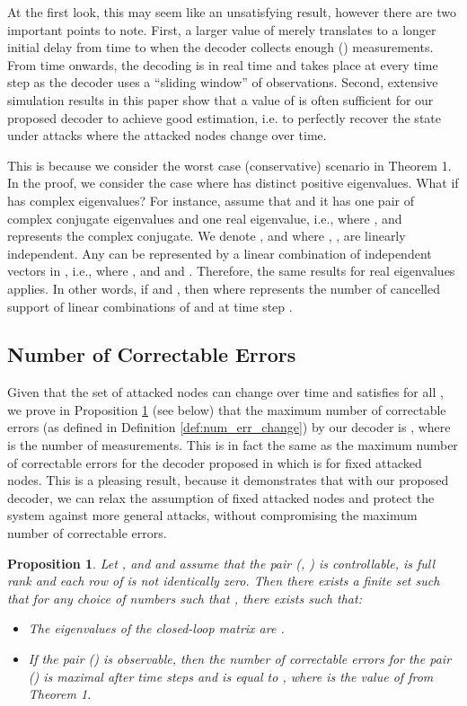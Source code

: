 \documentclass[journal]{IEEEtran}
\newtheorem{prop}{\bf{Proposition}}
\begin{document}
At the first look, this may seem like an unsatisfying result, however there are two important points to note. First, a larger value of  merely translates to a longer initial delay from time  to  when the decoder collects enough () measurements. From time  onwards, the decoding is in real time and takes place at every time step  as the decoder uses a ``sliding window'' of observations. Second, extensive simulation results in this paper show that a value of  is often sufficient for our proposed decoder to achieve good estimation, i.e. to perfectly recover the state under attacks where the attacked nodes change over time. 

This is because we consider the worst case (conservative) scenario in Theorem 1. 
In the proof, we consider the case where  has  distinct positive eigenvalues. What if  has complex eigenvalues? For instance, assume that   and it has one pair of complex conjugate eigenvalues and one real eigenvalue, i.e.,  where ,  and  represents the complex conjugate. We denote ,  and  where , ,  are linearly independent. Any  can be represented by a linear combination of  independent vectors in , i.e.,  where ,  and  and . Therefore, the same results for real eigenvalues applies. In other words, if  and , then  where  represents the number of cancelled support of linear combinations of  and  at time step .



\subsection{Number of Correctable Errors}\label{sec:max_q}

Given that the set of attacked nodes can change over time and  satisfies  for all , we prove in Proposition \ref{prop:maximum} (see below) that the maximum number of correctable errors (as defined in Definition \ref{def:num_err_change}) by our decoder is , where  is the number of measurements. This is in fact the same as the maximum number of correctable errors for the decoder proposed in \cite{Fawzi2014} which is for fixed attacked nodes.
This is a pleasing result, because it demonstrates that with our proposed decoder, we can relax the assumption of fixed attacked nodes and protect the system against more general attacks, without compromising the maximum number of correctable errors. 



\begin{prop}\label{prop:maximum} 
Let ,  and  and assume that the pair (, ) is controllable,  is full rank and each row of  is not identically zero. Then there exists a finite set  such that for any choice of  numbers  such that , there exists  such that:
\begin{itemize}
\item
The eigenvalues of the closed-loop matrix  are .
\item
If the pair () is observable, then the number of correctable errors for the pair () is maximal after  time steps and is equal to , where  is the value of  from Theorem 1. 
\end{itemize}
\end{prop}
\end{document}

